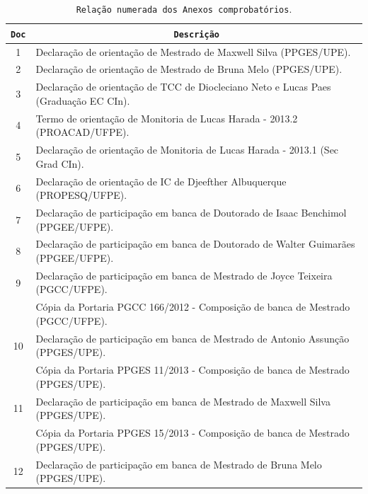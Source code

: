 \documentclass[a4paper,oneside,10pt]{article}
\newcommand{\otoprule}{\midrule[\heavyrulewidth]}
\begin{document}
\begin{table}[h]
\small
\caption{\texttt{Rela\c{c}\~{a}o numerada dos Anexos comprobat\'{o}rios}.}
\begin{tabular}{cl}
\toprule
\large{\textbf{\texttt{Doc}}} & \multicolumn{1}{c}{\large{\textbf{\texttt{Descri\c{c}\~{a}o}}}} \\
\otoprule
  1 & Declara\c{c}\~{a}o de orienta\c{c}\~{a}o de Mestrado de Maxwell Silva (PPGES/UPE). \\
  2 & Declara\c{c}\~{a}o de orienta\c{c}\~{a}o de Mestrado de Bruna Melo (PPGES/UPE). \\
  3 & Declara\c{c}\~{a}o de orienta\c{c}\~{a}o de TCC de Diocleciano Neto e Lucas Paes (Gradua\c{c}\~{a}o EC CIn). \\
  4 & Termo de orienta\c{c}\~{a}o de Monitoria de Lucas Harada - 2013.2 (PROACAD/UFPE). \\
  5 & Declara\c{c}\~{a}o de orienta\c{c}\~{a}o de Monitoria de Lucas Harada - 2013.1 (Sec Grad CIn). \\
  6 & Declara\c{c}\~{a}o de orienta\c{c}\~{a}o de IC de Djeefther Albuquerque (PROPESQ/UFPE). \\
  7 & Declara\c{c}\~{a}o de participa\c{c}\~{a}o em banca de Doutorado de Isaac Benchimol (PPGEE/UFPE). \\
  8 & Declara\c{c}\~{a}o de participa\c{c}\~{a}o em banca de Doutorado de Walter Guimar\~{a}es (PPGEE/UFPE). \\
  \cmidrule{1-2}
  9 & Declara\c{c}\~{a}o de participa\c{c}\~{a}o em banca de Mestrado de Joyce Teixeira (PGCC/UFPE). \\
    & C\'{o}pia da Portaria PGCC 166/2012 - Composi\c{c}\~{a}o de banca de Mestrado (PGCC/UFPE). \\
  \cmidrule{1-2}
  10 & Declara\c{c}\~{a}o de participa\c{c}\~{a}o em banca de Mestrado de Antonio Assun\c{c}\~{a}o (PPGES/UPE). \\
     & C\'{o}pia da Portaria PPGES 11/2013 - Composi\c{c}\~{a}o de banca de Mestrado (PPGES/UPE). \\
  \cmidrule{1-2}
  11 & Declara\c{c}\~{a}o de participa\c{c}\~{a}o em banca de Mestrado de Maxwell Silva (PPGES/UPE). \\
     & C\'{o}pia da Portaria PPGES 15/2013 - Composi\c{c}\~{a}o de banca de Mestrado (PPGES/UPE). \\
  \cmidrule{1-2}
  12 & Declara\c{c}\~{a}o de participa\c{c}\~{a}o em banca de Mestrado de Bruna Melo (PPGES/UPE). \\

\end{tabular}
\end{table}
\end{document}
